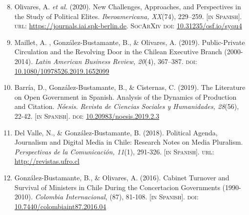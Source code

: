 \documentclass[letterpaper,margin]{res}
\newenvironment{benumerate}[1]{
    \let\oldItem\item
    \def\item{\addtocounter{enumi}{-2}\oldItem}
    \begin{enumerate}
    \setcounter{enumi}{#1}
    \addtocounter{enumi}{1}
}{
    \end{enumerate}
}
\begin{document}
\begin{resume}
\begin{benumerate}{7}
\item{\small Olivares, A. {\itshape et al.} (2020). New Challenges, Approaches, and Perspectives in the Study of Political Elites. {\itshape Iberoamericana, XX}(74), 229--259. {\footnotesize \scshape [in Spanish]}. {\scshape url}: \href{https://journals.iai.spk-berlin.de/index.php/iberoamericana/article/view/2736}{https://journals.iai.spk-berlin.de}. {\scshape {\footnotesize SocArXiv} doi}: \href{https://doi.org/10.31235/osf.io/syqu4}{10.31235/osf.io/syqu4}}\vspace{1mm}

\item{\small Maillet, A. , Gonz\'alez-Bustamante, B., \& Olivares, A. (2019). Public-Private Circulation and the Revolving Door in the Chilean Executive Branch (2000-2014). {\itshape Latin American Business Review, 20}(4), 367--387. {\scshape doi}: \href{https://doi.org/10.1080/10978526.2019.1652099}{10.1080/10978526.2019.1652099}}\vspace{1mm}

\item{\small Barr\'ia, D., Gonz\'alez-Bustamante, B., \& Cisternas, C. (2019). The Literature on Open Government in Spanish. Analysis of the Dynamics of Production and Citation. {\itshape N\'oesis. Revista de Ciencias Sociales y Humanidades, 28}(56), 22-42. {\footnotesize \scshape [in Spanish]}. {\scshape doi}: \href{http://dx.doi.org/10.20983/noesis.2019.2.3}{10.20983/noesis.2019.2.3}}\vspace{1mm}

\item{\small Del Valle, N., \& Gonz\'alez-Bustamante, B. (2018). Political Agenda, Journalism and Digital Media in Chile: Research Notes on Media Pluralism. {\itshape Perspectivas de la Comunicaci\'on, 11}(1), 291-326. {\footnotesize \scshape [in Spanish]}. {\scshape url}: \href{http://revistas.ufro.cl/ojs/index.php/perspectivas/article/view/1146}{http://revistas.ufro.cl}}\vspace{1mm}

\item{\small Gonz\'alez-Bustamante, B., \& Olivares, A. (2016). Cabinet Turnover and Survival of Ministers in Chile During the Concertacion Governments (1990-2010). {\itshape Colombia Internacional}, (87), 81-108. {\footnotesize \scshape [in Spanish]}. {\scshape doi}: \href{https://doi.org/10.7440/colombiaint87.2016.04}{10.7440/colombiaint87.2016.04}}\vspace{0.9mm}


\end{benumerate}
\end{resume}
\end{document}
